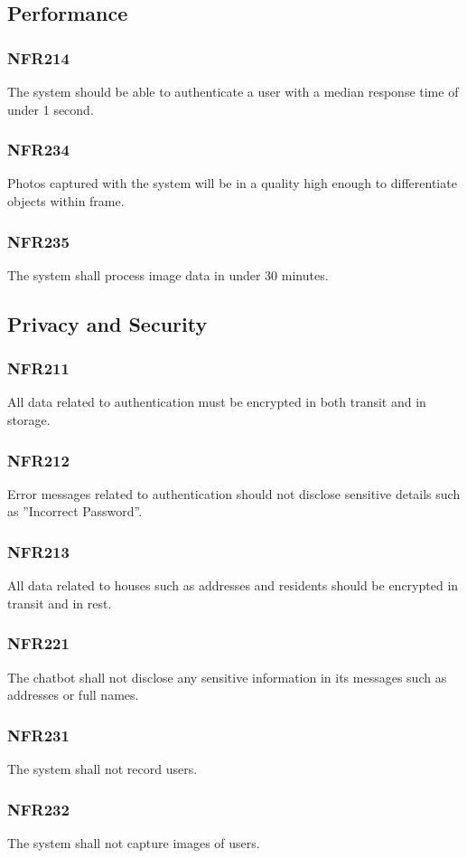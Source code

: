 \documentclass[12pt, titlepage]{article}
\begin{document}
\subsection{Performance}
\subsubsection{NFR214}
The system should be able to authenticate a user with a median
response time of under 1 second.
\subsubsection{NFR234} Photos captured with the system will be in a quality high
enough to differentiate objects within frame.
\subsubsection{NFR235}
The system shall process image data in under 30 minutes.

\subsection{Privacy and Security}
\subsubsection{NFR211}
All data related to authentication must be encrypted in both
transit and in storage.
\subsubsection{NFR212}
Error messages related to authentication should not disclose
sensitive details such as ”Incorrect Password”.
\subsubsection{NFR213}
All data related to houses such as addresses and residents should
be encrypted in transit and in rest.
\subsubsection{NFR221}
The chatbot shall not disclose any sensitive information in its
messages such as addresses or full names.
\subsubsection{NFR231}
The system shall not record users.
\subsubsection{NFR232}
The system shall not capture images of users.
\end{document}
